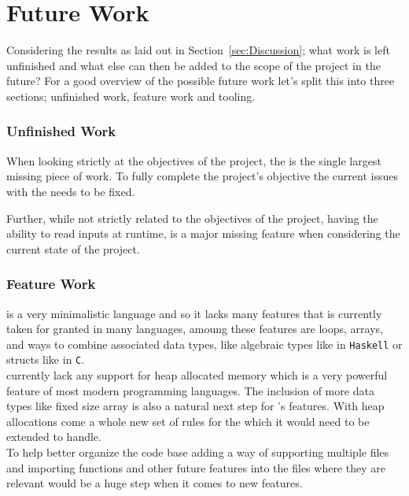 \section{Future Work}
\label{sec:FutureWork}

Considering the results as laid out in Section~\ref{sec:Discussion}; what work is left
unfinished and what else can then be added to the scope of the project in the future?
For a good overview of the possible future work let's split this into three sections;
unfinished work, feature work and tooling.

\subsubsection{Unfinished Work}
\label{sec:unfinished}

When looking strictly at the objectives of the project, the \borrowChecker{} is the
single largest missing piece of work. To fully complete the project's objective the
current issues with the \borrowChecker{} needs to be fixed. 

Further, while not strictly related to the objectives of the project, having the
ability to read inputs at runtime, is a major missing feature when considering the
current state of the project.

\subsubsection{Feature Work}
\label{sec:feature}

\lang{} is a very minimalistic language and so it lacks many features that is
currently taken for granted in many languages, amoung these features are loops,
arrays, and ways to combine associated data types, like algebraic types like in
\texttt{Haskell} or structs like in \texttt{C}.\\

\lang{} currently lack any support for heap allocated memory which is a very powerful
feature of most modern programming languages. The inclusion of more data types like
fixed size array is also a natural next step for \lang's features. With heap
allocations come a whole new set of rules for the \borrowChecker{} which it would
need to be extended to handle. \\

To help better organize the code base adding a way of supporting multiple files and
importing functions and other future features into the files where they are relevant
would be a huge step when it comes to new features. \\

